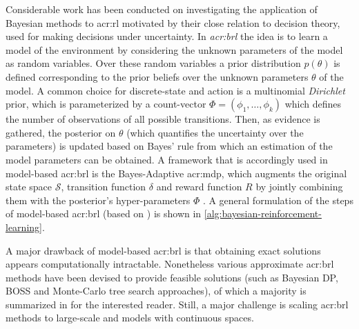 Considerable work has been conducted on investigating the application of Bayesian methods to \acrshort{acr:rl} motivated by their close relation to decision theory, used for making decisions under uncertainty. 
In \textit{\acrfull{acr:brl}} the idea is to learn a model of the environment by considering the unknown parameters of the model as random variables.
Over these random variables a prior distribution $p(\theta)$ is defined corresponding to the prior beliefs over the unknown parameters $\theta$ of the model.
A common choice for discrete-state and action  is a multinomial \textit{Dirichlet} prior, which is parameterized by a count-vector $\Phi = (\phi_1, \ldots, \phi_k)$ which defines the number of observations of all possible transitions.
Then, as evidence is gathered, the posterior on $\theta$ (which quantifies the uncertainty over the parameters) is updated based on Bayes' rule from which an estimation of the model parameters can be obtained.
A framework that is accordingly used in model-based \acrshort{acr:brl} is the Bayes-Adaptive \acrshort{acr:mdp}, which augments the original state space $\mathcal{S}$, transition function $\delta$ and reward function $R$ by jointly combining them with the posterior's hyper-parameters $\Phi$ \cite{guez2012efficient}.
A general formulation of the steps of model-based \acrshort{acr:brl} (based on \cite{png2011bayesian}) is shown in \autoref{alg:bayesian-reinforcement-learning}.

A major drawback of model-based \acrshort{acr:brl} is that obtaining exact solutions appears computationally intractable.
Nonetheless various approximate \acrshort{acr:brl} methods have been devised to provide feasible solutions (such as Bayesian DP, BOSS and Monte-Carlo tree search approaches), of which a majority is summarized in \cite{ghavamzadeh2015bayesian} for the interested reader.
Still, a major challenge is scaling \acrshort{acr:brl} methods to large-scale  and models with continuous spaces.

\newpage


